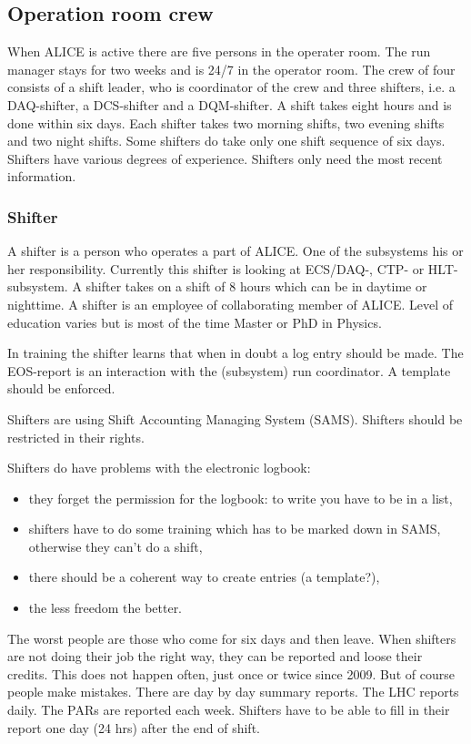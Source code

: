 \subsection{Operation room crew}
When ALICE is active there are five persons in the operater room. The run manager stays for two weeks and is 24/7 in the operator room. The crew of four consists of a shift leader, who is coordinator of the crew and three shifters, i.e. a DAQ-shifter, a DCS-shifter and a DQM-shifter. A shift takes eight hours and is done within six days. Each shifter takes two morning shifts, two evening shifts and two night shifts. Some shifters do take only one shift sequence of six days. Shifters have various degrees of experience. Shifters only need the most recent information. 

\subsubsection{Shifter}
A shifter is a person who operates a part of ALICE. One of the subsystems his or her responsibility. Currently this shifter is looking at ECS/DAQ-, CTP- or HLT-subsystem. A shifter takes on a shift of 8 hours which can be in daytime or nighttime. A shifter is an employee of collaborating member of ALICE. Level of education varies but is most of the time Master or PhD in Physics.

In training the shifter learns that when in doubt a log entry should be made. The EOS-report is an interaction with the (subsystem) run coordinator. A template should be enforced. 

Shifters are using Shift Accounting Managing System (SAMS). Shifters should be restricted in their rights. 

Shifters do have problems with the electronic logbook:
\begin{itemize}
  \item they forget the permission for the logbook: to write you have to be in a list,
  \item shifters have to do some training which has to be marked down in SAMS, otherwise they can't do a shift,
  \item there should be a coherent way to create entries (a template?),
  \item the less freedom the better.
\end{itemize}

The worst people are those who come for six days and then leave. When shifters are not doing their job the right way, they can be reported and loose their credits. This does not happen often, just once or twice since 2009. But of course people make mistakes. There are day by day summary reports. The LHC reports daily. The PARs are reported each week. Shifters have to be able to fill in their report one day (24 hrs) after the end of shift.

